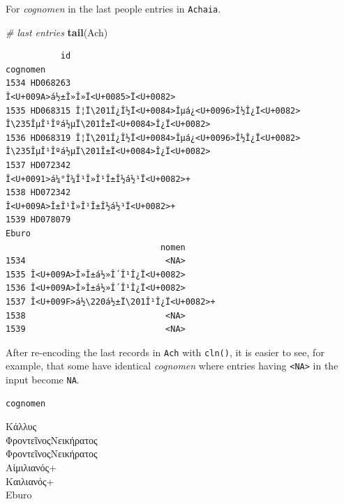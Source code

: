 \documentclass[a4paper,11pt]{memoir}
\newenvironment{Shaded}{\begin{snugshade}}{\end{snugshade}}
\newcommand{\CommentTok}[1]{\textcolor[rgb]{0.56,0.35,0.01}{\textit{#1}}}
\newcommand{\ErrorTok}[1]{\textcolor[rgb]{0.64,0.00,0.00}{\textbf{#1}}}
\newcommand{\KeywordTok}[1]{\textcolor[rgb]{0.13,0.29,0.53}{\textbf{#1}}}
\newcommand{\NormalTok}[1]{#1}
\newcommand{\OperatorTok}[1]{\textcolor[rgb]{0.81,0.36,0.00}{\textbf{#1}}}
\newcommand{\StringTok}[1]{\textcolor[rgb]{0.31,0.60,0.02}{#1}}
\begin{document}
\bigbreak 

For \emph{cognomen} in the last people entries in \texttt{Achaia}.

\begin{Shaded}
\begin{Highlighting}[]
\CommentTok{# last entries}
\KeywordTok{tail}\NormalTok{(Ach)}
\end{Highlighting}
\end{Shaded}

\begin{verbatim}
           id                                                                       cognomen
1534 HD068263                                             Î<U+009A>á½±Î»Î»Ï<U+0085>Ï<U+0082>
1535 HD068315 Î¦Ï\201Î¿Î½Ï<U+0084>Îµá¿<U+0096>Î½Î¿Ï<U+0082> Î\235ÎµÎ¹Îºá½µÏ\201Î±Ï<U+0084>Î¿Ï<U+0082>
1536 HD068319 Î¦Ï\201Î¿Î½Ï<U+0084>Îµá¿<U+0096>Î½Î¿Ï<U+0082> Î\235ÎµÎ¹Îºá½µÏ\201Î±Ï<U+0084>Î¿Ï<U+0082>
1537 HD072342                                          Î<U+0091>á¼°Î¼Î¹Î»Î¹Î±Î½á½¹Ï<U+0082>+
1538 HD072342                                             Î<U+009A>Î±Î¹Î»Î¹Î±Î½á½¹Ï<U+0082>+
1539 HD078079                                                                          Eburo
                               nomen
1534                            <NA>
1535 Î<U+009A>Î»Î±á½»Î´Î¹Î¿Ï<U+0082>
1536 Î<U+009A>Î»Î±á½»Î´Î¹Î¿Ï<U+0082>
1537 Î<U+009F>á½\220á½±Ï\201Î¹Î¿Ï<U+0082>+
1538                            <NA>
1539                            <NA>
\end{verbatim}

After re-encoding the last records in \texttt{Ach} with \texttt{cln()},
it is easier to see, for example, that some have identical
\emph{cognomen} where entries having
\texttt{\textless{}NA\textgreater{}} in the input become \texttt{NA}.

\begin{Shaded}
\end{Shaded}

\begin{verbatim}
cognomen
\end{verbatim}

\noindent
Κάλλυς \\
ΦροντεῖνοςΝεικήρατος \\
ΦροντεῖνοςΝεικήρατος \\
Αἰμιλιανός+ \\
Καιλιανός+\\
Eburo\\
\end{document}
